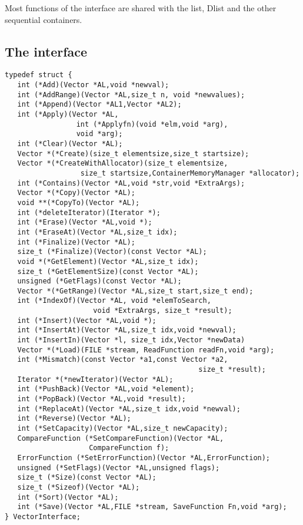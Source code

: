 \documentclass[12pt,a4paper]{memoir} %
\begin{document}
{{Most functions of the interface are shared with the list, Dlist and the other sequential containers.

\subsection{The interface}
\begin{verbatim}
typedef struct {
   int (*Add)(Vector *AL,void *newval);
   int (*AddRange)(Vector *AL,size_t n, void *newvalues);
   int (*Append)(Vector *AL1,Vector *AL2);
   int (*Apply)(Vector *AL,
                 int (*Applyfn)(void *elm,void *arg),
                 void *arg);
   int (*Clear)(Vector *AL);
   Vector *(*Create)(size_t elementsize,size_t startsize);
   Vector *(*CreateWithAllocator)(size_t elementsize,
                  size_t startsize,ContainerMemoryManager *allocator);
   int (*Contains)(Vector *AL,void *str,void *ExtraArgs);
   Vector *(*Copy)(Vector *AL);
   void **(*CopyTo)(Vector *AL);
   int (*deleteIterator)(Iterator *);
   int (*Erase)(Vector *AL,void *);
   int (*EraseAt)(Vector *AL,size_t idx);
   int (*Finalize)(Vector *AL);
   size_t (*Finalize)(Vector)(const Vector *AL);
   void *(*GetElement)(Vector *AL,size_t idx);
   size_t (*GetElementSize)(const Vector *AL);
   unsigned (*GetFlags)(const Vector *AL);
   Vector *(*GetRange)(Vector *AL,size_t start,size_t end);
   int (*IndexOf)(Vector *AL, void *elemToSearch,
                     void *ExtraArgs, size_t *result);
   int (*Insert)(Vector *AL,void *);
   int (*InsertAt)(Vector *AL,size_t idx,void *newval);
   int (*InsertIn)(Vector *l, size_t idx,Vector *newData)
   Vector *(*Load)(FILE *stream, ReadFunction readFn,void *arg);
   int (*Mismatch)(const Vector *a1,const Vector *a2,
                                              size_t *result);
   Iterator *(*newIterator)(Vector *AL);
   int (*PushBack)(Vector *AL,void *element);
   int (*PopBack)(Vector *AL,void *result);
   int (*ReplaceAt)(Vector *AL,size_t idx,void *newval);
   int (*Reverse)(Vector *AL);
   int (*SetCapacity)(Vector *AL,size_t newCapacity);
   CompareFunction (*SetCompareFunction)(Vector *AL,
                    CompareFunction f);
   ErrorFunction (*SetErrorFunction)(Vector *AL,ErrorFunction);
   unsigned (*SetFlags)(Vector *AL,unsigned flags);
   size_t (*Size)(const Vector *AL);
   size_t (*Sizeof)(Vector *AL);
   int (*Sort)(Vector *AL);
   int (*Save)(Vector *AL,FILE *stream, SaveFunction Fn,void *arg);
} VectorInterface;
\end{verbatim}
}}
\end{document}
